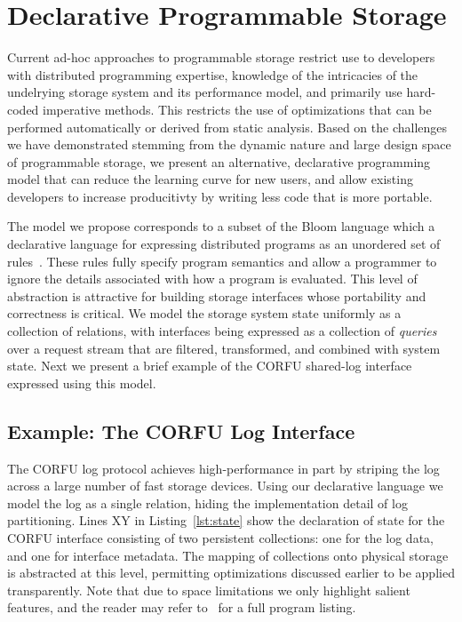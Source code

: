 \section{Declarative Programmable Storage}
\label{sec:prog-model}

Current ad-hoc approaches to programmable storage restrict use to developers
with distributed programming expertise, knowledge of the intricacies of the
undelrying storage system and its performance model, and primarily use
hard-coded imperative methods. This restricts the use of optimizations that
can be performed automatically or derived from static analysis.  Based on the
challenges we have demonstrated stemming from the dynamic nature and large
design space of programmable storage, we present an alternative, declarative
programming model that can reduce the learning curve for new users, and allow
existing developers to increase producitivty by writing less code that is more
portable.

The model we propose corresponds to a subset of the Bloom language which a
declarative language for expressing distributed programs as an unordered set
of rules~\cite{alvaro:cidr11}. These rules fully specify program semantics and
allow a programmer to ignore the details associated with how a program is
evaluated. This level of abstraction is attractive for building storage
interfaces whose portability and correctness is critical. We model the
storage system state uniformly as a collection of relations, with interfaces
being expressed as a collection of \emph{queries} over a request stream that
are filtered, transformed, and combined with system state. Next we present a
brief example of the CORFU shared-log interface expressed using this model.

\subsection{Example: The CORFU Log Interface}

The CORFU log protocol achieves high-performance in part by striping the log
across a large number of fast storage devices. Using our declarative language
we model the log as a single relation, hiding the implementation detail of log
partitioning. Lines XY in Listing~\ref{lst:state} show the declaration of
state for the CORFU interface consisting of two persistent collections: one
for the log data, and one for interface metadata. The mapping of collections
onto physical storage is abstracted at this level, permitting optimizations
discussed earlier to be applied transparently.  Note that due to space
limitations we only highlight salient features, and the reader may refer
to~\cite{watkins:ucsc-soe-16-12} for a full program listing.

